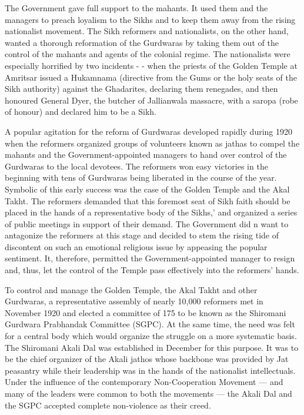 \begin{multicols}{2}
The Government gave full support to the mahants. It used them and the managers to preach loyalism to the Sikhs and to keep them away from the rising nationalist movement. The Sikh reformers and nationalists, on the other hand, wanted a thorough reformation of the Gurdwaras by taking them out of the control of the mahants and agents of the colonial regime. The nationalists were especially horrified by two incidents - - when the priests of the Golden Temple at Amritsar issued a Hukamnama (directive from the Gums or the holy seats of the Sikh authority) against the Ghadarites, declaring them renegades, and then honoured General Dyer, the butcher of Jallianwala massacre, with a saropa (robe of honour) and declared him to be a Sikh.

A popular agitation for the reform of Gurdwaras developed rapidly during 1920 when the reformers organized groups of volunteers known as jathas to compel the mahants and the Government-appointed managers to hand over control of the Gurdwaras to the local devotees. The reformers won easy victories in the beginning with tens of Gurdwaras being liberated in the course of the year. Symbolic of this early success was the case of the Golden Temple and the Akal Takht. The reformers demanded that this foremost seat of Sikh faith should be placed in the hands of a representative body of the Sikhs,' and organized a series of public meetings in support of their demand. The Government did n want to antagonize the reformers at this stage and decided to stem the rising tide of discontent on such an emotional religious issue by appeasing the popular sentiment. It, therefore, permitted the Government-appointed manager to resign and, thus, let the control of the Temple pass effectively into the reformers' hands.

To control and manage the Golden Temple, the Akal Takht and other Gurdwaras, a representative assembly of nearly 10,000 reformers met in November 1920 and elected a committee of 175 to be known as the Shiromani Gurdwara Prabhandak Committee (SGPC). At the same time, the need was felt for a central body which would organize the struggle on a more systematic basis. The Shiromani Akali Dal was established in December for this purpose. It was to be the chief organizer of the Akali jathos whose backbone was provided by Jat peasantry while their leadership was in the hands of the nationalist intellectuals. Under the influence of the contemporary Non-Cooperation Movement --- and many of the leaders were common to both the movements --- the Akali Dal and the SGPC accepted complete non-violence as their creed.


\end{multicols}
